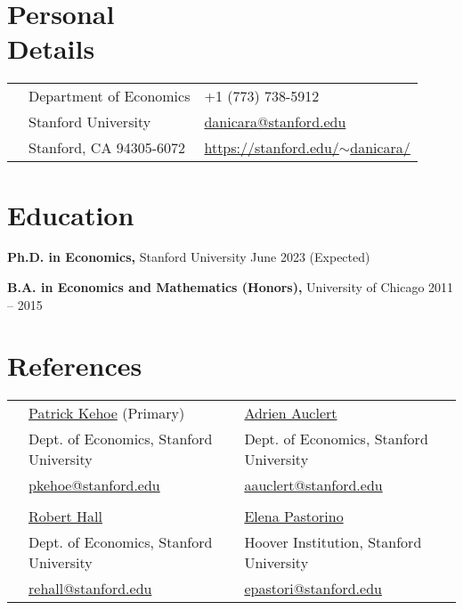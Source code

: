 \documentclass[margin,line]{res}                          %
\newenvironment{list1}{
	\begin{list}{\ding{113}}{%
			\setlength{\itemsep}{0in}
			\setlength{\parsep}{0in} \setlength{\parskip}{0in}
			\setlength{\topsep}{0in} \setlength{\partopsep}{0in}
			\setlength{\leftmargin}{0.17in}}}{\end{list}}
\begin{document}
	
	
	\begin{resume}
		\thispagestyle{plain} %
		
		\section{\sc Personal \\Details}
		\vspace{.05in}
		\begin{tabular}{@{}p{0.20in}p{2.75in}p{2.75in}}
			& Department of Economics      & +1 (773) 738-5912
			\\    
			& Stanford University  & \href{mailto:danicara@stanford.edu}{danicara@stanford.edu} \\                
			& Stanford, CA 94305-6072 %
			& \href{https://stanford.edu/~danicara/}{https://stanford.edu/$\sim$danicara/}%
		\end{tabular}
		
		\section{\sc Education}
		\begin{list1}
			\item[] \textbf{Ph.D. in Economics,} Stanford University \hfill June 2023 (Expected)\smallskip			
			\item[] \textbf{B.A. in Economics and Mathematics (Honors),} University of Chicago \hfill 2011 -- 2015	
		\end{list1}
		
		\section{\sc References}
		\vspace{.05in}
		\begin{tabular}{@{}p{0.20in}p{2.75in}p{2.75in}}
			&   \href{https://pkehoe.people.stanford.edu/}{Patrick Kehoe}   (Primary)  & \href{https://aauclert.people.stanford.edu/}{Adrien Auclert} \\    
			& Dept. of Economics, Stanford University  &   Dept. of Economics, Stanford University\\    
			&   \href{mailto:pkehoe@stanford.edu}{pkehoe@stanford.edu}   &  \href{mailto:aauclert@stanford.edu}{aauclert@stanford.edu} \\    
			& & \\
			&  \href{https://rehall.people.stanford.edu/}{Robert Hall}   &   \href{https://sites.google.com/site/elenapastorino1econ}{Elena Pastorino}  
			\\
			& Dept. of Economics, Stanford University   &   Hoover Institution, Stanford University  
			\\
			& \href{mailto:rehall@stanford.edu}{rehall@stanford.edu}   &   \href{mailto:epastori@stanford.edu}{epastori@stanford.edu}
		\end{tabular}
		

\end{resume}
\end{document}
